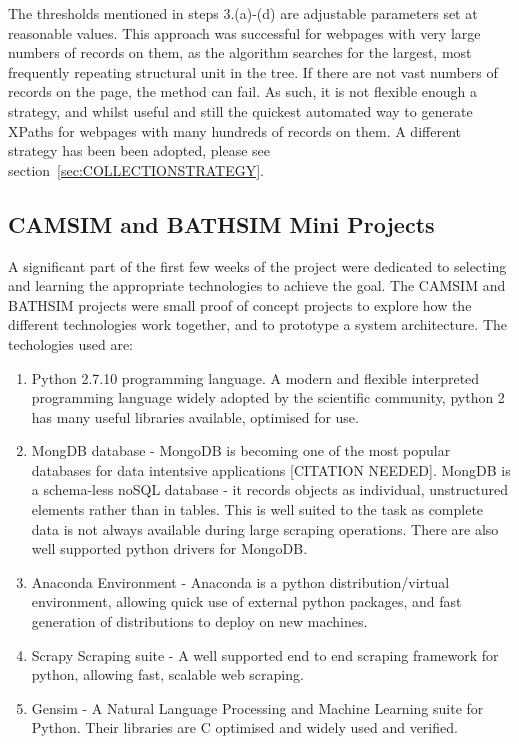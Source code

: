 \documentclass[11pt, oneside]{article}   	%
\begin{document}
The thresholds mentioned in steps 3.(a)-(d) are adjustable parameters set at reasonable values. This approach was successful for webpages with very large numbers of records on them, as the algorithm searches for the largest, most frequently repeating structural unit in the tree. If there are not vast numbers of records on the page, the method can fail.
As such, it is not flexible enough a strategy, and whilst useful and still the quickest automated way to generate XPaths for webpages with many hundreds of records on them. A different strategy has been been adopted, please see section~\ref{sec:COLLECTIONSTRATEGY}.
\subsection{CAMSIM and BATHSIM Mini Projects}
A significant part of the first few weeks of the project were dedicated to selecting and learning the appropriate technologies to achieve the goal. The CAMSIM and BATHSIM projects were small proof of concept projects to explore how the different technologies work together, and to prototype a system architecture.
The techologies used are:
\begin{enumerate}
\item Python 2.7.10 programming language. A modern and flexible interpreted programming language widely adopted by the scientific community, python 2 has many useful libraries available, optimised for use.
\item MongDB database - MongoDB is becoming one of the most popular databases for data intentsive applications [CITATION NEEDED]. MongDB is a schema-less noSQL database - it records objects as individual, unstructured elements rather than in tables. This is well suited to the task as complete data is not always available during large scraping operations. There are also well supported python drivers for MongoDB. 
\item Anaconda Environment - Anaconda is a python distribution/virtual environment, allowing quick use of external python packages, and fast generation of distributions to deploy on new machines.
\item Scrapy Scraping suite - A well supported end to end scraping framework for python, allowing fast, scalable web scraping. 
\item Gensim - A Natural Language Processing and Machine Learning suite for Python. Their libraries are C optimised and widely used and verified.
\end{enumerate}
\end{document}
